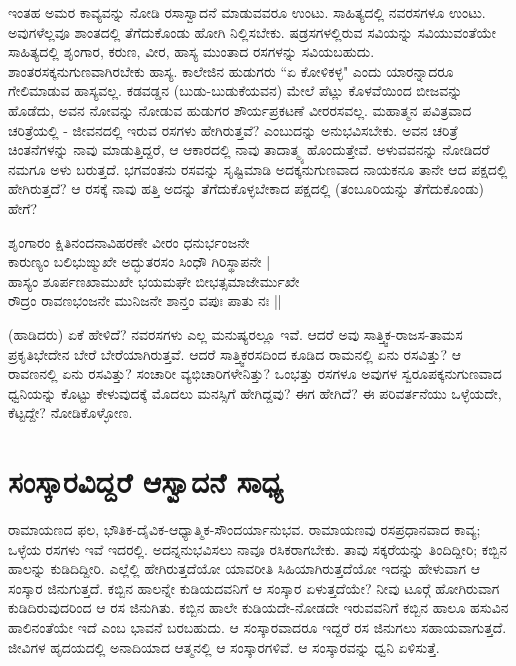 ಇಂತಹ ಅಮರ ಕಾವ್ಯವನ್ನು ನೋಡಿ ರಸಾಸ್ವಾದನೆ ಮಾಡುವವರೂ ಉಂಟು. ಸಾಹಿತ್ಯದಲ್ಲಿ ನವರಸಗಳೂ ಉಂಟು. ಅವುಗಳೆಲ್ಲವೂ ಶಾಂತದಲ್ಲಿ ತೆಗೆದುಕೊಂಡು ಹೋಗಿ ನಿಲ್ಲಿಸಬೇಕು. ಷಡ್ರಸಗಳಲ್ಲಿರುವ ಸವಿಯನ್ನು ಸವಿಯುವಂತೆಯೇ ಸಾಹಿತ್ಯದಲ್ಲಿ ಶೃಂಗಾರ, ಕರುಣ, ವೀರ, ಹಾಸ್ಯ ಮುಂತಾದ ರಸಗಳನ್ನು ಸವಿಯಬಹುದು. ಶಾಂತರಸಕ್ಕನುಗುಣವಾಗಿರಬೇಕು ಹಾಸ್ಯ. ಕಾಲೇಜಿನ ಹುಡುಗರು ``ಏ ಕೋಳಿಕಳ್ಳ" ಎಂದು ಯಾರನ್ನಾದರೂ ಗೇಲಿಮಾಡುವ ಹಾಸ್ಯವಲ್ಲ. ಕಡವಡ್ಡನ (ಬುಡು-ಬುಡುಕೆಯವನ) ಮೇಲೆ ಪೆಟ್ಲು ಕೊಳವೆಯಿಂದ ಬೀಜವನ್ನು ಹೊಡೆದು, ಅವನ ನೋವನ್ನು ನೋಡುವ ಹುಡುಗರ ಶೌರ್ಯಪ್ರಕಟಣೆ ವೀರರಸವಲ್ಲ. ಮಹಾತ್ಮನ ಪವಿತ್ರವಾದ ಚರಿತ್ರೆಯಲ್ಲಿ - ಜೀವನದಲ್ಲಿ ಇರುವ ರಸಗಳು ಹೇಗಿರುತ್ತವೆ? ಎಂಬುದನ್ನು ಅನುಭವಿಸಬೇಕು. ಅವನ ಚರಿತ್ರೆ ಚಿಂತನೆಗಳನ್ನು ನಾವು ಮಾಡುತ್ತಿದ್ದರೆ, ಆ ಆಕಾರದಲ್ಲಿ ನಾವು ತಾದಾತ್ಮ್ಯ ಹೊಂದುತ್ತೇವೆ. ಅಳುವವನನ್ನು ನೋಡಿದರೆ ನಮಗೂ ಅಳು ಬರುತ್ತದೆ. ಭಗವಂತನು ರಸವನ್ನು ಸೃಷ್ಟಿಮಾಡಿ ಅದಕ್ಕನುಗುಣವಾದ ನಾಯಕನೂ ತಾನೇ ಆದ ಪಕ್ಷದಲ್ಲಿ ಹೇಗಿರುತ್ತದೆ? ಆ ರಸಕ್ಕೆ ನಾವು ಹತ್ತಿ ಅದನ್ನು ತೆಗೆದುಕೊಳ್ಳಬೇಕಾದ ಪಕ್ಷದಲ್ಲಿ (ತಂಬೂರಿಯನ್ನು ತೆಗೆದುಕೊಂಡು) ಹೇಗೆ? 

\begin{shloka}
ಶೃಂಗಾರಂ ಕ್ಷಿತಿನಂದನಾವಿಹರಣೇ ವೀರಂ ಧನುರ್ಭಂಜನೇ\\ 
ಕಾರುಣ್ಯಂ ಬಲಿಭುಙ್ಮುಖೇ ಅದ್ಭುತರಸಂ ಸಿಂಧೌ ಗಿರಿಸ್ಥಾಪನೇ |\\ 
ಹಾಸ್ಯಂ ಶೂರ್ಪಣಖಾಮುಖೇ ಭಯಮಘೇ ಬೀಭತ್ಸಮಾಜೇರ್ಮುಖೇ\\ 
ರೌದ್ರಂ ರಾವಣಭಂಜನೇ ಮುನಿಜನೇ ಶಾನ್ತಂ ವಪುಃ ಪಾತು ನಃ || 
\end{shloka}

(ಹಾಡಿದರು) ಏಕೆ ಹೇಳಿದೆ? ನವರಸಗಳು ಎಲ್ಲ ಮನುಷ್ಯರಲ್ಲೂ ಇವೆ. ಆದರೆ ಅವು ಸಾತ್ತ್ವಿಕ-ರಾಜಸ-ತಾಮಸ ಪ್ರಕೃತಿಭೇದೇನ ಬೇರೆ ಬೇರೆಯಾಗಿರುತ್ತವೆ. ಆದರೆ ಸಾತ್ತ್ವಿಕರಸದಿಂದ ಕೂಡಿದ ರಾಮನಲ್ಲಿ ಏನು ರಸವಿತ್ತು? ಆ ರಾವಣನಲ್ಲಿ ಏನು ರಸವಿತ್ತು? ಸಂಚಾರೀ ವ್ಯಭಿಚಾರಿಗಳೇನಿತ್ತು? ಒಂಭತ್ತು ರಸಗಳೂ ಅವುಗಳ ಸ್ವರೂಪಕ್ಕನುಗುಣವಾದ ಧ್ವನಿಯನ್ನು ಕೊಟ್ಟು ಕೇಳುವುದಕ್ಕೆ ಮೊದಲು ಮನಸ್ಸಿಗೆ  ಹೇಗಿದ್ದವು? ಈಗ ಹೇಗಿದೆ? ಈ ಪರಿವರ್ತನೆಯು ಒಳ್ಳೆಯದೇ, ಕೆಟ್ಟದ್ದೇ? ನೋಡಿಕೊಳ್ಳೋಣ. 

\section*{ಸಂಸ್ಕಾರವಿದ್ದರೆ ಆಸ್ವಾದನೆ ಸಾಧ್ಯ} 

ರಾಮಾಯಣದ ಫಲ, ಭೌತಿಕ-ದೈವಿಕ-ಆಧ್ಯಾತ್ಮಿಕ-ಸೌಂದರ್ಯಾನುಭವ. ರಾಮಾಯಣವು ರಸಪ್ರಧಾನವಾದ ಕಾವ್ಯ; ಒಳ್ಳೆಯ ರಸಗಳು ಇವೆ ಇದರಲ್ಲಿ. ಅದನ್ನನುಭವಿಸಲು ನಾವೂ ರಸಿಕರಾಗಬೇಕು. ತಾವು ಸಕ್ಕರೆಯನ್ನು ತಿಂದಿದ್ದೀರಿ; ಕಬ್ಬಿನ ಹಾಲನ್ನು ಕುಡಿದಿದ್ದೀರಿ. ಎಲ್ಲೆಲ್ಲಿ ಹೇಗಿರುತ್ತದೆಯೋ ಯಾವರೀತಿ ಸಿಹಿಯಾಗಿರುತ್ತದೆಯೋ ಇದನ್ನು ಹೇಳುವಾಗ ಆ ಸಂಸ್ಕಾರ ಜಿನುಗುತ್ತದೆ. ಕಬ್ಬಿನ ಹಾಲನ್ನೇ ಕುಡಿಯದವನಿಗೆ ಆ ಸಂಸ್ಕಾರ ಏಳುತ್ತದೆಯೇ? ನೀವು ಟೂರ್‍ಗೆ ಹೋಗಿರುವಾಗ ಕುಡಿದಿರುವುದರಿಂದ ಆ ರಸ ಜಿನುಗಿತು. ಕಬ್ಬಿನ ಹಾಲೇ ಕುಡಿಯದೇ-ನೋಡದೇ ಇರುವವನಿಗೆ ಕಬ್ಬಿನ ಹಾಲೂ ಹಸುವಿನ ಹಾಲಿನಂತೆಯೇ ಇದೆ ಎಂಬ ಭಾವನೆ ಬರಬಹುದು. ಆ ಸಂಸ್ಕಾರವಾದರೂ ಇದ್ದರೆ ರಸ ಜಿನುಗಲು ಸಹಾಯವಾಗುತ್ತದೆ. ಜೀವಿಗಳ ಹೃದಯದಲ್ಲಿ ಅನಾದಿಯಾದ ಆತ್ಮನಲ್ಲಿ ಆ ಸಂಸ್ಕಾರಗಳಿವೆ. ಆ ಸಂಸ್ಕಾರವನ್ನು ಧ್ವನಿ ಏಳಿಸುತ್ತೆ. 

